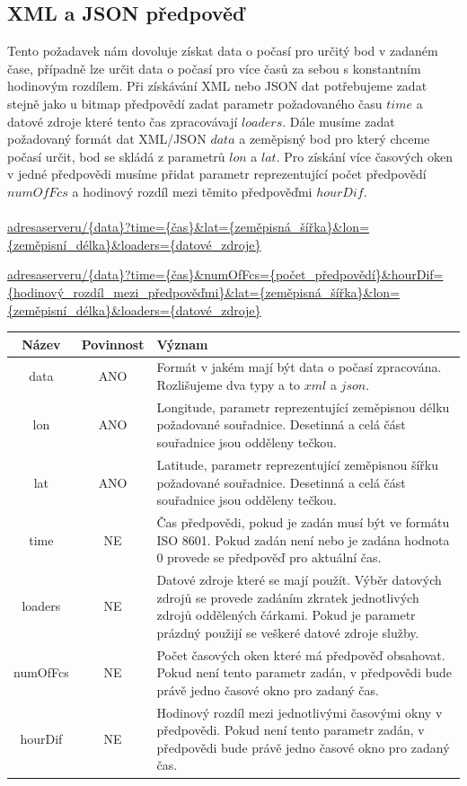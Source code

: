 \documentclass[czech,bachelor,dept460,male,csharp,cpdeclaration]{diploma}
\begin{document}
	\subsection{XML a JSON předpověď}
	
	Tento požadavek nám dovoluje získat data o počasí pro určitý bod v zadaném čase, případně lze určit data o počasí pro více časů za sebou s konstantním hodinovým rozdílem. Při získávání XML nebo JSON dat potřebujeme zadat stejně jako u bitmap předpovědí zadat parametr požadovaného času $time$ a datové zdroje které tento čas zpracovávají $loaders$. Dále musíme zadat požadovaný formát dat XML/JSON $data$ a zeměpisný bod pro který chceme počasí určit, bod se skládá z parametrů $lon$ a $lat$. Pro získání více časových oken v jedné předpovědi musíme přidat parametr reprezentující počet předpovědí $numOfFcs$ a hodinový rozdíl mezi těmito předpověďmi $hourDif$.
	\\\\
	\url{adresaserveru/{data}?time={čas}\&lat={zeměpisná\_šířka}\&lon={zeměpisní\_délka}\&loaders={datové\_zdroje}}
	
	\begin{flushleft}
		\url{adresaserveru/{data}?time={čas}\&numOfFcs={počet\_předpovědí}\&hourDif={hodinový\_rozdíl\_mezi\_předpověďmi}\&lat={zeměpisná\_šířka}\&lon={zeměpisní\_délka}\&loaders={datové\_zdroje}}
	\end{flushleft}
	
	\begin{center}
		
		
		\begin{tabular}{c c p{13cm}}
			Název & Povinnost & Význam \\
			\midrule
			data & ANO & Formát v jakém mají být data o počasí zpracována. Rozlišujeme dva typy a to $xml$ a $json$.\\
			lon & ANO & Longitude, parametr reprezentující zeměpisnou délku požadované souřadnice. Desetinná a celá část souřadnice jsou odděleny tečkou.\\
			lat & ANO & Latitude, parametr reprezentující zeměpisnou šířku požadované souřadnice. Desetinná a celá část souřadnice jsou odděleny tečkou.\\
			time & NE & Čas předpovědi, pokud je zadán musí být ve formátu ISO 8601. Pokud zadán není nebo je zadána hodnota 0  provede se předpověď pro aktuální čas.\\ 
			loaders & NE & Datové zdroje které se mají použít. Výběr datových zdrojů se provede zadáním zkratek jednotlivých zdrojů oddělených čárkami. Pokud je parametr prázdný použijí se veškeré datové zdroje služby. \\
			numOfFcs & NE & Počet časových oken které má předpověď obsahovat. Pokud není tento parametr zadán, v předpovědi bude právě jedno časové okno pro zadaný čas.\\
			hourDif & NE & Hodinový rozdíl mezi jednotlivými časovými okny v předpovědi. Pokud není tento parametr zadán, v předpovědi bude právě jedno časové okno pro zadaný čas.\\
		\end{tabular}
	\end{center}
	
\end{document}
